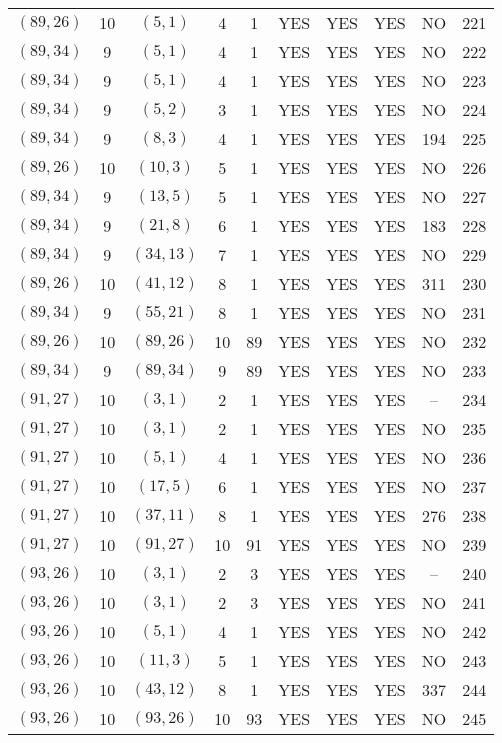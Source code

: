 \begin{longtable}{|c|c|c|c|c|c|c|c|c|c|}
$(89, 26)$ & 10 & $(5, 1)$ & 4 & 1 & YES & YES & YES & NO & 221\\
$(89, 34)$ & 9 & $(5, 1)$ & 4 & 1 & YES & YES & YES & NO & 222\\
$(89, 34)$ & 9 & $(5, 1)$ & 4 & 1 & YES & YES & YES & NO & 223\\
$(89, 34)$ & 9 & $(5, 2)$ & 3 & 1 & YES & YES & YES & NO & 224\\
$(89, 34)$ & 9 & $(8, 3)$ & 4 & 1 & YES & YES & YES & 194 & 225\\
$(89, 26)$ & 10 & $(10, 3)$ & 5 & 1 & YES & YES & YES & NO & 226\\
$(89, 34)$ & 9 & $(13, 5)$ & 5 & 1 & YES & YES & YES & NO & 227\\
$(89, 34)$ & 9 & $(21, 8)$ & 6 & 1 & YES & YES & YES & 183 & 228\\
$(89, 34)$ & 9 & $(34, 13)$ & 7 & 1 & YES & YES & YES & NO & 229\\
$(89, 26)$ & 10 & $(41, 12)$ & 8 & 1 & YES & YES & YES & 311 & 230\\
$(89, 34)$ & 9 & $(55, 21)$ & 8 & 1 & YES & YES & YES & NO & 231\\
$(89, 26)$ & 10 & $(89, 26)$ & 10 & 89 & YES & YES & YES & NO & 232\\
$(89, 34)$ & 9 & $(89, 34)$ & 9 & 89 & YES & YES & YES & NO & 233\\
$(91, 27)$ & 10 & $(3, 1)$ & 2 & 1 & YES & YES & YES & -- & 234\\
$(91, 27)$ & 10 & $(3, 1)$ & 2 & 1 & YES & YES & YES & NO & 235\\
$(91, 27)$ & 10 & $(5, 1)$ & 4 & 1 & YES & YES & YES & NO & 236\\
$(91, 27)$ & 10 & $(17, 5)$ & 6 & 1 & YES & YES & YES & NO & 237\\
$(91, 27)$ & 10 & $(37, 11)$ & 8 & 1 & YES & YES & YES & 276 & 238\\
$(91, 27)$ & 10 & $(91, 27)$ & 10 & 91 & YES & YES & YES & NO & 239\\
$(93, 26)$ & 10 & $(3, 1)$ & 2 & 3 & YES & YES & YES & -- & 240\\
$(93, 26)$ & 10 & $(3, 1)$ & 2 & 3 & YES & YES & YES & NO & 241\\
$(93, 26)$ & 10 & $(5, 1)$ & 4 & 1 & YES & YES & YES & NO & 242\\
$(93, 26)$ & 10 & $(11, 3)$ & 5 & 1 & YES & YES & YES & NO & 243\\
$(93, 26)$ & 10 & $(43, 12)$ & 8 & 1 & YES & YES & YES & 337 & 244\\
$(93, 26)$ & 10 & $(93, 26)$ & 10 & 93 & YES & YES & YES & NO & 245\\

\end{longtable}
